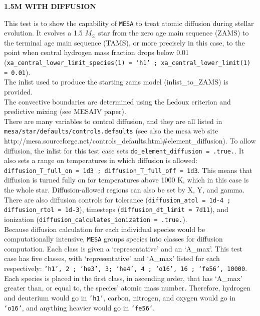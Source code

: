 \documentclass{article}
\begin{document}
	
	\begin{center}
		\begin{Large}
		       \textbf{1.5M WITH DIFFUSION}\\
		\end{Large}
	\end{center}

        This test is to show the capability of \texttt{MESA} to treat 	atomic diffusion during stellar evolution.  It evolves a 1.5 $M_\odot$ star from the zero age main sequence (ZAMS) to the terminal age main sequence (TAMS), or more precisely in this case, to the point when central hydrogen mass fraction drops below 0.01 (\texttt{xa\_central\_lower\_limit\_species(1) = 'h1' ; xa\_central\_lower\_limit(1) = 0.01}).\\
        
        The inlist used to produce the starting zams model (inlist\_to\_ZAMS) is provided.\\

        The convective boundaries are determined using the Ledoux criterion and predictive mixing (see MESAIV paper).\\
        
        
        There are many variables to control diffusion, and they are all listed in \texttt{mesa/star/defaults/controls.defaults} (see also the mesa web site http://mesa.sourceforge.net/controls\_defaults.html\#element\_diffusion).  To allow diffusion, the inlist for this test case sets \texttt{do\_element\_diffusion = .true.}.  It also sets a range on temperatures in which diffusion is allowed: \texttt{diffusion\_T\_full\_on = 1d3 ; diffusion\_T\_full\_off = 1d3}.  This means that diffusion is turned fully on for temperatures above 1000 K, which in this case is the whole star.  Diffusion-allowed regions can also be set by X, Y, and gamma.  There are also diffusion controls for tolerance (\texttt{diffusion\_atol = 1d-4 ; diffusion\_rtol = 1d-3}), timesteps (\texttt{diffusion\_dt\_limit = 7d11}), and ionization (\texttt{diffusion\_calculates\_ionization = .true.}).\\

        Because diffusion calculation for each individual species would be computationally intensive, \texttt{MESA} groups species into classes for diffusion computation.  Each class is given a `representative' and an `A\_max'.  This test case has five classes, with `representative' and `A\_max' listed for each respectively:  \texttt{`h1', 2 ; `he3', 3; `he4', 4 ; `o16', 16 ; `fe56', 10000}.  Each species is placed in the first class, in ascending order, that has `A\_max' greater than, or equal to, the species' atomic mass number.  Therefore, hydrogen and deuterium would go in \texttt{`h1'}, carbon, nitrogen, and oxygen would go in \texttt{`o16'}, and anything heavier would go in \texttt{`fe56'}.\\
\end{document}
